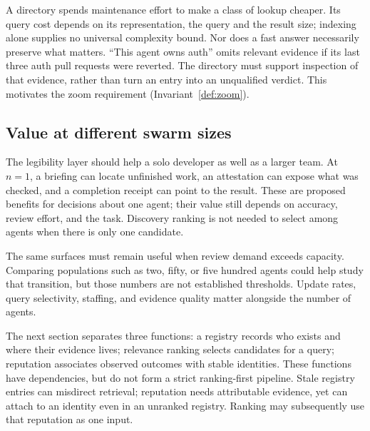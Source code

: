 \documentclass[11pt,a4paper]{article}
\theoremstyle{definition}
\theoremstyle{plain}
\begin{document}

A directory spends maintenance effort to make a class of lookup cheaper.
Its query cost depends on its representation, the query and the result size;
indexing alone supplies no universal complexity bound. Nor does a fast answer
necessarily preserve what matters. ``This agent owns auth'' omits relevant
evidence if its last three auth pull requests were reverted. The directory
must support inspection of that evidence, rather than turn an entry into an
unqualified verdict. This motivates the zoom requirement
(Invariant~\ref{def:zoom}).

\ifdefined\pdswisslandmarkplate
\begin{figure}[p]
  \centering
\end{figure}
\pdmarginpagebreak
\fi

\subsection{Value at different swarm sizes}\label{sec:value-curve}

The legibility layer should help a solo developer as well as a larger team.
At $n=1$, a briefing can locate unfinished work, an attestation can expose what
was checked, and a completion receipt can point to the result. These are proposed
benefits for decisions about one agent; their value still depends on accuracy,
review effort, and the task. Discovery ranking is not needed to select among
agents when there is only one candidate.

The same surfaces must remain useful when review demand exceeds capacity.
Comparing populations such as two, fifty, or five hundred agents could help
study that transition, but those numbers are not established thresholds. Update
rates, query selectivity, staffing, and evidence quality matter alongside the
number of agents.

The next section separates three functions: a registry records who exists and
where their evidence lives; relevance ranking selects candidates for a query;
reputation associates observed outcomes with stable identities. These functions
have dependencies, but do not form a strict ranking-first pipeline. Stale registry
entries can misdirect retrieval; reputation needs attributable evidence, yet can
attach to an identity even in an unranked registry. Ranking may subsequently use
that reputation as one input.
\end{document}
